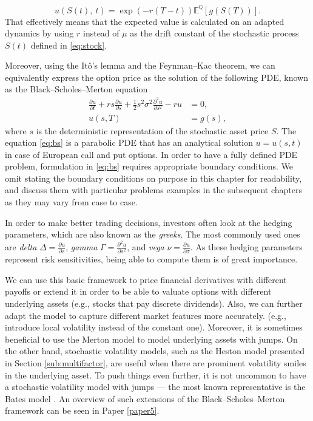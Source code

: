 \documentclass{UUThesisTemplate}
\begin{document}
\begin{equation}
\label{eq:mc}
u(S(t),\ t)=\exp\left(-r(T-t)\right)\mathbb{E}^{\mathbb{Q}}\left[g(S(T))\right].
\end{equation}
That effectively means that the expected value is calculated on an adapted dynamics by using $r$ instead of $\mu$ as the drift constant of the stochastic process $S(t)$ defined in \eqref{eq:stock}. 
\par Moreover, using the It\^o's lemma and the Feynman--Kac theorem, we can equivalently express the option price as the solution of the following PDE, known as the Black--Scholes--Merton equation
\begin{align}
\frac{\partial u}{\partial t} + r s \frac{\partial u} {\partial s} + \frac{1}{2} s^2 \sigma^2 \frac{\partial^2 u}{\partial s^2} - r u &= 0, \nonumber \\
u(s,T) &= g(s), \label{eq:bs}
\end{align}
where $s$ is the deterministic representation of the stochastic asset price $S$. The equation \eqref{eq:bs} is a parabolic PDE that has an analytical solution $u=u(s,t)$ in case of European call and put options. In order to have a fully defined PDE problem, formulation in \eqref{eq:bs} requires appropriate boundary conditions. We omit stating the boundary conditions on purpose in this chapter for readability, and discuss them with particular problems examples in the subsequent chapters as they may vary from case to case. %
\par In order to make better trading decisions, investors often look at the hedging parameters, which are also known as the \emph{greeks}. The most commonly used ones are \emph{delta} $\Delta = \frac{\partial u}{\partial s}$, \emph{gamma} $\Gamma = \frac{\partial^2 u}{\partial s^2}$, and \emph{vega} $\nu = \frac{\partial u}{\partial \sigma}$. As these hedging parameters represent risk sensitivities, being able to compute them is of great importance.
\par We can use this basic framework to price financial derivatives with different payoffs or extend it in order to be able to valuate options with different underlying assets (e.g., stocks that pay discrete dividends). Also, we can further adapt the model to capture different market features more accurately. (e.g., introduce local volatility instead of the constant one). Moreover, it is sometimes beneficial to use the Merton model \cite{merton1976option} to model underlying assets with jumps. On the other hand, stochastic volatility models, such as the Heston model presented in Section \ref{sub:multifactor}, are useful when there are prominent volatility smiles in the underlying asset. To push things even further, it is not uncommon to have a stochastic volatility model with jumps --- the most known representative is the Bates model \cite{bates1996jumps}. An overview of such extensions of the Black--Scholes--Merton framework can be seen in Paper \ref{paper5}.
%
\end{document}
